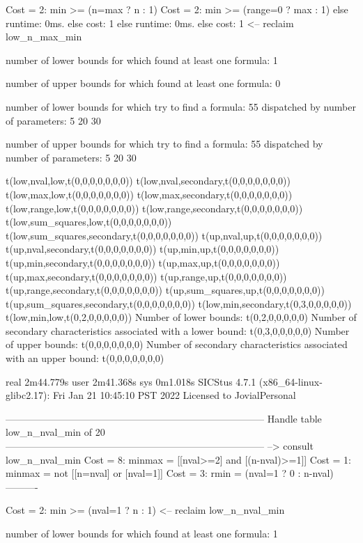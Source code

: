 Cost =  2:  min >= (n=max ? n : 1)
Cost =  2:  min >= (range=0 ? max : 1)
else runtime: 0ms. else cost: 1
else runtime: 0ms. else cost: 1
<-- reclaim low_n_max_min

number of lower bounds for which found at least one formula: 1

number of upper bounds for which found at least one formula: 0

number of lower bounds for which try to find a formula: 55
dispatched by number of parameters: 5  20  30

number of upper bounds for which try to find a formula: 55
dispatched by number of parameters: 5  20  30

t(low,nval,low,t(0,0,0,0,0,0,0))
t(low,nval,secondary,t(0,0,0,0,0,0,0))
t(low,max,low,t(0,0,0,0,0,0,0))
t(low,max,secondary,t(0,0,0,0,0,0,0))
t(low,range,low,t(0,0,0,0,0,0,0))
t(low,range,secondary,t(0,0,0,0,0,0,0))
t(low,sum_squares,low,t(0,0,0,0,0,0,0))
t(low,sum_squares,secondary,t(0,0,0,0,0,0,0))
t(up,nval,up,t(0,0,0,0,0,0,0))
t(up,nval,secondary,t(0,0,0,0,0,0,0))
t(up,min,up,t(0,0,0,0,0,0,0))
t(up,min,secondary,t(0,0,0,0,0,0,0))
t(up,max,up,t(0,0,0,0,0,0,0))
t(up,max,secondary,t(0,0,0,0,0,0,0))
t(up,range,up,t(0,0,0,0,0,0,0))
t(up,range,secondary,t(0,0,0,0,0,0,0))
t(up,sum_squares,up,t(0,0,0,0,0,0,0))
t(up,sum_squares,secondary,t(0,0,0,0,0,0,0))
t(low,min,secondary,t(0,3,0,0,0,0,0))
t(low,min,low,t(0,2,0,0,0,0,0))
Number of lower bounds:                                             t(0,2,0,0,0,0,0)
Number of secondary characteristics associated with a lower bound:  t(0,3,0,0,0,0,0)
Number of upper bounds:                                             t(0,0,0,0,0,0,0)
Number of secondary characteristics associated with an upper bound: t(0,0,0,0,0,0,0)

real	2m44.779s
user	2m41.368s
sys	0m1.018s
SICStus 4.7.1 (x86_64-linux-glibc2.17): Fri Jan 21 10:45:10 PST 2022
Licensed to JovialPersonal


--------------------------------------------------------------------------------
Handle table low_n_nval_min of 20
--------------------------------------------------------------------------------
--> consult low_n_nval_min
Cost =  8:  minmax = [[nval>=2] and [(n-nval)>=1]]
Cost =  1:  minmax = not [[n=nval] or [nval=1]]
Cost =  3:  rmin   = (nval=1 ? 0 : n-nval)
----------

Cost =  2:  min >= (nval=1 ? n : 1)
<-- reclaim low_n_nval_min

number of lower bounds for which found at least one formula: 1

